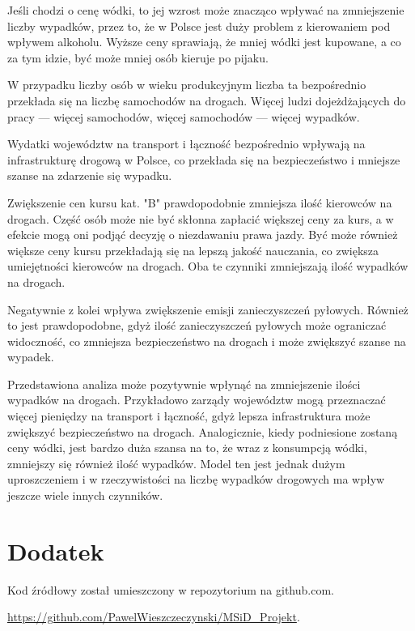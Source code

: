 \documentclass[10pt]{article}
\begin{document}
Jeśli chodzi o cenę wódki, to jej wzrost może znacząco wpływać na zmniejszenie liczby wypadków, przez to, że w Polsce jest duży problem z kierowaniem pod wpływem alkoholu. Wyższe ceny sprawiają, że mniej wódki jest kupowane, a co za tym idzie, być może mniej osób kieruje po pijaku.

W przypadku liczby osób w wieku produkcyjnym liczba ta bezpośrednio przekłada się na liczbę samochodów na drogach. Więcej ludzi dojeżdżających do pracy — więcej samochodów, więcej samochodów — więcej wypadków.

Wydatki województw na transport i łączność bezpośrednio wpływają na infrastrukturę drogową w Polsce, co przekłada się na bezpieczeństwo i mniejsze szanse na zdarzenie się wypadku.

Zwiększenie cen kursu kat. "B" prawdopodobnie zmniejsza ilość kierowców na drogach. Część osób może nie być skłonna zapłacić większej ceny za kurs, a w efekcie mogą oni podjąć decyzję o niezdawaniu prawa jazdy. Być może również większe ceny kursu przekładają się na lepszą jakość nauczania, co zwiększa umiejętności kierowców na drogach. Oba te czynniki zmniejszają ilość wypadków na drogach.

Negatywnie z kolei wpływa zwiększenie emisji zanieczyszczeń pyłowych. Również to jest prawdopodobne, gdyż ilość zanieczyszczeń pyłowych może ograniczać widoczność, co zmniejsza bezpieczeństwo na drogach i może zwiększyć szanse na wypadek.

Przedstawiona analiza może pozytywnie wpłynąć na zmniejszenie ilości wypadków na drogach. Przykładowo zarządy województw mogą przeznaczać więcej pieniędzy na transport i łączność, gdyż lepsza infrastruktura może zwiększyć bezpieczeństwo na drogach. Analogicznie, kiedy podniesione zostaną ceny wódki, jest bardzo duża szansa na to, że wraz z konsumpcją wódki, zmniejszy się również ilość wypadków. Model ten jest jednak dużym uproszczeniem i w rzeczywistości na liczbę wypadków drogowych ma wpływ jeszcze wiele innych czynników. 

\appendix
\section{Dodatek}
Kod źródłowy został umieszczony w repozytorium na github.com.

\noindent \url{https://github.com/PawelWieszczeczynski/MSiD_Projekt}.
\end{document}
